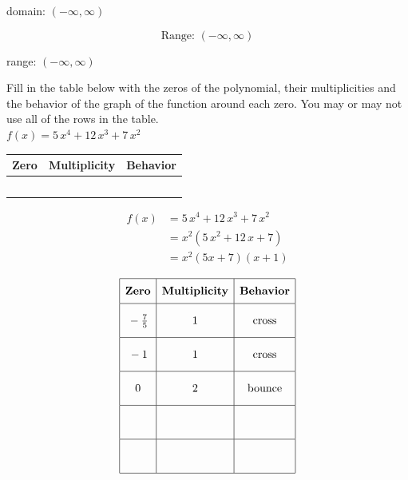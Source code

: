 \documentclass[11pt]{exam}
\begin{document}
\begin{questions}
\begin{parts}
\begin{solution}
domain: \(\boxed{ (-\infty, \infty) }\)

\[\text{Range: } (-\infty, \infty)\]

range: \(\boxed{ (-\infty, \infty) }\)
\end{solution}

\end{parts}

\label{exact-endoca}
\newpage

\headerbox{\ocd}
\label{exact-startocd}

\question[10] Fill in the table below with the zeros of the polynomial, their multiplicities and the behavior of the graph of the function around each zero. You may or may not use all of the rows in the table.\\

\(\displaystyle{ f(x) = 5 \, x^{4} + 12 \, x^{3} + 7 \, x^{2} }\)

\renewcommand{\arraystretch}{3}
\begin{tabular}{|p{20mm}|p{25mm}|p{20mm}|}\hline
\textbf{Zero} & \textbf{Multiplicity} & \textbf{Behavior}\\ \hline
 & & \\ \hline
 & & \\ \hline
 & & \\ \hline
 & & \\ \hline
 & & \\ \hline
\end{tabular}

\begin{solution}
\[\begin{aligned} f(x) &= 5 \, x^{4} + 12 \, x^{3} + 7 \, x^{2} \\ &= x^2(5 \, x^{2} + 12 \, x + 7) \\ &= x^2(5x + 7)(x + 1) \end{aligned}\]

 \[\begin{array}{|c|c|c|} \hline \rule[-0.8em]{0pt}{2.2em} \textbf{Zero} & \textbf{Multiplicity} & \textbf{Behavior} \\ \hline \rule[-1.2em]{0pt}{3em} -\frac{7}{5} & 1 & \text{cross} \\ \hline \rule[-1.2em]{0pt}{3em} -1 & 1 & \text{cross} \\ \hline \rule[-1.2em]{0pt}{3em} 0 & 2 & \text{bounce} \\ \hline \rule[-1.2em]{0pt}{3em} & & \\ \hline \rule[-1.2em]{0pt}{3em} & & \\ \hline \end{array}\]
\end{solution}
\newpage


\end{questions}
\end{document}
